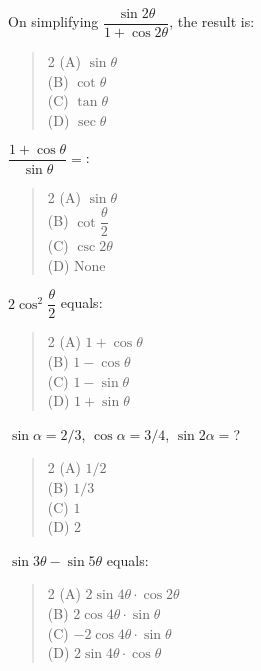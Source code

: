 \documentclass[11pt,a4paper]{article}
\begin{document}
\begin{mcqlist}
\item On simplifying $\dfrac{\sin2\theta}{1+\cos2\theta}$, the result is:
\begin{quote}\begin{multicols}{2}
\noindent (A) $\sin\theta$ \\
(B) $\cot\theta$ \\
(C) $\tan\theta$ \\
(D) $\sec\theta$
\end{multicols}\end{quote}

\item $\dfrac{1+\cos\theta}{\sin\theta} = $:
\begin{quote}\begin{multicols}{2}
\noindent (A) $\sin\theta$ \\
(B) $\cot\dfrac{\theta}{2}$ \\
(C) $\csc2\theta$ \\
(D) None
\end{multicols}\end{quote}

\item $2\cos^2\dfrac{\theta}{2}$ equals:
\begin{quote}\begin{multicols}{2}
\noindent (A) $1+\cos\theta$ \\
(B) $1-\cos\theta$ \\
(C) $1-\sin\theta$ \\
(D) $1+\sin\theta$
\end{multicols}\end{quote}

\item $\sin\alpha=2/3$, $\cos\alpha=3/4$, $\sin2\alpha = $?
\begin{quote}\begin{multicols}{2}
\noindent (A) $1/2$ \\
(B) $1/3$ \\
(C) $1$ \\
(D) $2$
\end{multicols}\end{quote}

\item $\sin3\theta-\sin5\theta$ equals:
\begin{quote}\begin{multicols}{2}
\noindent (A) $2\sin4\theta\cdot\cos2\theta$ \\
(B) $2\cos4\theta\cdot\sin\theta$ \\
(C) $-2\cos4\theta\cdot\sin\theta$ \\
(D) $2\sin4\theta\cdot\cos\theta$
\end{multicols}\end{quote}


\end{mcqlist}
\end{document}
